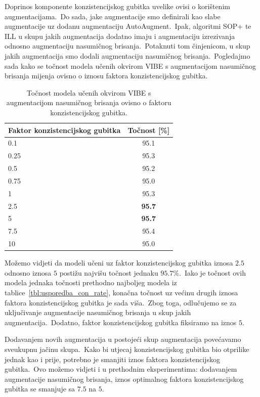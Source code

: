 \documentclass[diplomskirad]{fer}
\begin{document}
Doprinos komponente konzistencijskog gubitka uvelike ovisi o korištenim augmentacijama.\ 
Do sada, jake augmentacije smo definirali kao slabe augmentacije uz dodanu augmentaciju AutoAugment.\ 
Ipak, algoritmi SOP+ te ILL u skupu jakih augmentacija dodatno imaju i augmentaciju izrezivanja odnosno augmentaciju nasumičnog brisanja.\ 
Potaknuti tom činjenicom, u skup jakih augmentacija smo dodali augmentaciju nasumičnog brisanja.\ Pogledajmo sada kako se točnost modela učenih okvirom VIBE s augmentacijom nasumičnog brisanja mijenja ovisno o iznosu faktora konzistencijskog gubitka.\ 

\begin{table}[htb]
  \caption{Točnost modela učenih okvirom VIBE s augmentacijom nasumičnog brisanja ovisno o faktoru konzistencijskog gubitka.}
  \label{tbl:usporedba_con_rate_rand_erase}
  \centering
  \begin{tabular}{l||c}
  Faktor konzistencijskog gubitka & Točnost [\%] \\ \hline \hline
  0.1 & 95.1 \\
  0.25 & 95.3 \\
  0.5 & 95.2 \\
  0.75 & 95.0 \\
  1 & 95.3 \\
  2.5 & \textbf{95.7} \\
  5 & \textbf{95.7} \\
  7.5 & 95.4 \\
  10 & 95.0 \\
  \end{tabular}
\end{table}

Možemo vidjeti da modeli učeni uz faktor konzistencijskog gubitka iznosa $2.5$ odnosno iznosa $5$ postižu najvišu točnost jednaku $95.7\%$.\ 
Iako je točnost ovih modela jednaka točnosti prethodno najboljeg modela iz tablice~\ref{tbl:usporedba_con_rate}, konačna točnost uz većinu drugih iznosa faktora konzistencijskog gubitka je sada viša.\ 
Zbog toga, odlučujemo se za uključivanje augmentacije nasumičnog brisanja u skup jakih augmentacija.\ Dodatno, faktor konzistencijskog gubitka fiksiramo na iznos $5$.\ 

Dodavanjem novih augmentacija u postojeći skup augmentacija povećavamo sveukupnu jačinu skupa.\ Kako bi utjecaj konzistencijskog gubitka bio otprilike jednak kao i prije, potrebno je smanjiti iznos faktora konzistencijskog gubitka.\ 
Ovo možemo vidjeti i u prethodnim eksperimentima: dodavanjem augmentacije nasumičnog brisanja, iznos optimalnog faktora konzistencijskog gubitka se smanjuje sa $7.5$ na $5$.\ 
\end{document}
